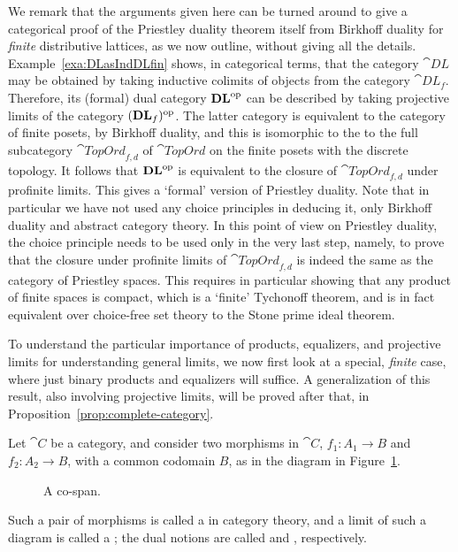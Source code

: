 \begin{remark}\label{rem:priestley-as-procompletion}
We remark that the arguments given here can be turned around to give a
categorical proof of the Priestley duality theorem itself from Birkhoff duality
for \emph{finite} distributive lattices, as we now outline, without giving all
the details. Example~\ref{exa:DLasIndDLfin} shows, in categorical terms, that
the category $\cat{DL}$ may be obtained by taking inductive colimits of objects
from the category $\cat{DL}_f$. Therefore, its (formal) dual category
$\mathbf{DL}^{\mathrm{op}}$ can be described by taking projective limits of the category
$(\mathbf{DL}_f)^{\mathrm{op}}$. The latter category is equivalent to the category of finite
posets, by Birkhoff duality, and this is isomorphic to the to the full
subcategory $\cat{TopOrd}_{f,d}$ of $\cat{TopOrd}$ on the finite posets with the
discrete topology. It follows that $\mathbf{DL}^{\mathrm{op}}$ is equivalent to the closure
of $\cat{TopOrd}_{f,d}$ under profinite limits. This gives a `formal' version of
Priestley duality. Note that in particular we have not used any choice
principles in deducing it, only Birkhoff duality and abstract category theory. 
In this point of view on Priestley duality, the choice principle needs to
be used only in the very last step, namely, to prove that the closure under profinite limits of $\cat{TopOrd}_{f,d}$
is indeed the same as the category of Priestley spaces. This requires in
particular showing that any product of finite spaces is compact, which is a
`finite' Tychonoff theorem, and is in fact equivalent over choice-free set
theory to the Stone prime ideal theorem. 
\end{remark}
To understand the particular importance of products, equalizers, and projective limits for understanding general limits, we now 
first look at a special, \emph{finite} case, where just binary products and equalizers will suffice. A generalization of this result, also involving projective limits, will be proved after that, in Proposition~\ref{prop:complete-category}. 

Let $\cat{C}$ be a category,
and consider two morphisms in $\cat{C}$, $f_1 \colon A_1 \to B$ and $f_2 \colon
A_2 \to B$, with a common codomain $B$, as in the diagram in
Figure~\ref{fig:cospan}.
\begin{figure}[htp]
\begin{center}
\end{center}
\caption{A co-span.}
\label{fig:cospan}
\end{figure}
Such a pair of morphisms is called a 
in category theory, and a limit of such a diagram is called a
; the dual notions are called  and
, respectively. 

